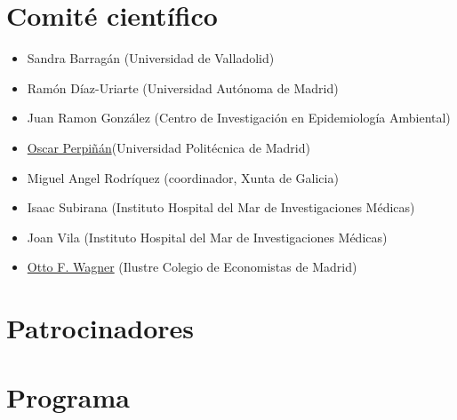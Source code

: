 \chapter{Comité científico}


\begin{itemize}

\item Sandra Barragán (Universidad de Valladolid)
\item Ramón Díaz-Uriarte (Universidad Autónoma de Madrid)
\item Juan Ramon González (Centro de Investigación en Epidemiología Ambiental)
\item \href{http://oscarperpinan.github.io}{Oscar
    Perpiñán}(Universidad Politécnica de Madrid)
\item Miguel Angel Rodríquez (coordinador, Xunta de Galicia)
\item Isaac Subirana (Instituto Hospital del Mar de Investigaciones Médicas)
\item Joan Vila (Instituto Hospital del Mar de Investigaciones Médicas)
\item \href{http://www.ottofwagner.es}{Otto F. Wagner} (Ilustre Colegio de Economistas de Madrid)

\end{itemize}


\chapter{Patrocinadores}



\chapter{Programa}



